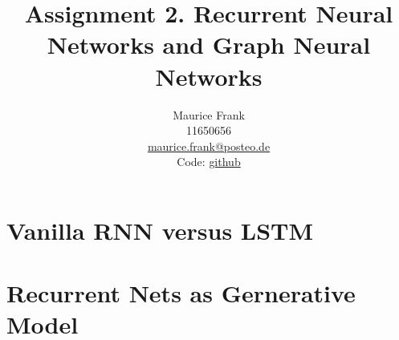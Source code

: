 \documentclass{article}
\title{Assignment 2. Recurrent Neural Networks and Graph Neural Networks}
\author{%
  Maurice Frank\\
  11650656\\
  \href{mailto:maurice.frank@posteo.de}{maurice.frank@posteo.de} \\
  Code: \href{https://github.com/morris-frank/uvadlc_practicals_2019/tree/master/assignment_2}{github}
}
\newcommand\·{\ensuremath{\cdot}}
\newcommand\…{\ensuremath{\dots}}
\newcommand{\⇔}{\ensuremath{\iff}}
\newcommand{\⇐}{\ensuremath{\impliedby}}
\newcommand{\⇒}{\ensuremath{\implies}}
\newcommand\1{\ensuremath{\mathds{1}}}
\newcommand\ℝ{\ensuremath{\mathds{R}}}
\begin{document}
\maketitle

\section{Vanilla RNN versus LSTM}
\subsection{}
\subsection{}
\subsection{}
\subsection{}
\subsection{}
\subsubsection{}
\subsubsection{}
\subsection{}

\section{Recurrent Nets as Gernerative Model}
\subsection{}
\subsubsection{}
\subsubsection{}
\subsubsection{}
\end{document}
